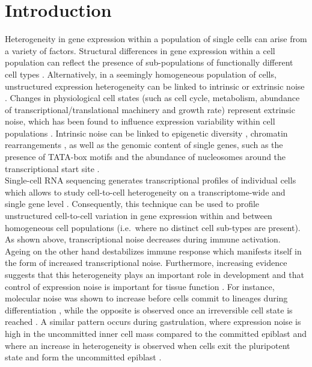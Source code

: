 
\section{Introduction}

Heterogeneity in gene expression within a population of single cells can arise from a variety of factors. Structural differences in gene expression within a cell population can reflect the presence of sub-populations of functionally different cell types \citep{Zeisel2015, Paul2015}. Alternatively, in a seemingly homogeneous population of cells,  unstructured expression heterogeneity can be linked to intrinsic or extrinsic noise \citep{Elowitz2002}. Changes in physiological cell states (such as cell cycle, metabolism, abundance of transcriptional/translational machinery and growth rate) represent extrinsic noise, which has been found to influence expression variability within cell populations \citep{Keren2015, Buettner2015, Zeng2017}. Intrinsic noise can be linked to epigenetic diversity \citep{Smallwood2014}, chromatin rearrangements \citep{Buenrostro2015}, as well as the genomic content of single genes, such as the presence of TATA-box motifs and the abundance of nucleosomes around the transcriptional start site \citep{Hornung2012}.  \\ 

Single-cell RNA sequencing generates transcriptional profiles of individual cells which allows to study cell-to-cell heterogeneity on a transcriptome-wide \citep{Grun2014} and single gene level \citep{Goolam2016}. Consequently, this technique can be used to profile unstructured cell-to-cell variation in gene expression within and between homogeneous cell populations (i.e.~where no distinct cell sub-types are present). As shown above, transcriptional noise decreases during immune activation. Ageing on the other hand destabilizes immune response which manifests itself in the form of increased transcriptional noise. Furthermore, increasing evidence suggests that this heterogeneity plays an important role in development \citep{Chang2008} and that control of expression noise is important for tissue function \citep{BaharHalpern2015}. For instance, molecular noise was shown to increase before cells commit to lineages during differentiation \citep{Mojtahedi2016}, while the opposite is observed once an irreversible cell state is reached \citep{Richard2016}. A similar pattern occurs during gastrulation, where expression noise is high in the uncommitted inner cell mass compared to the committed epiblast and where an increase in heterogeneity is observed when cells exit the pluripotent state and form the uncommitted epiblast \citep{Mohammed2017}. \\

